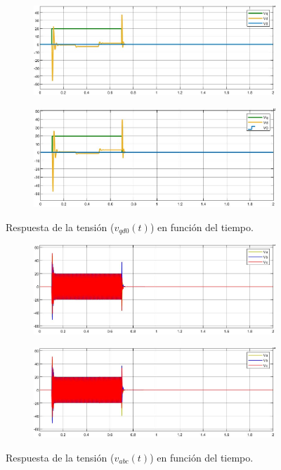 \documentclass{article}
\begin{document}
\begin{figure}[H]
    \centering
    \begin{subfigure}[b]{0.8\textwidth}
        \includegraphics[width=\textwidth]{5.1.6_vqd0.jpg}
    \end{subfigure}
    \begin{subfigure}[b]{0.8\textwidth}
        \includegraphics[width=1\textwidth]{5.1.6_vqd0_NL.jpg}
    \end{subfigure}
    \caption{Respuesta de la tensión ($v_{qd0}(t)$) en función del tiempo.}
    \label{fig:temperatura}
\end{figure}

\begin{figure}[H]
    \centering
    \begin{subfigure}[b]{0.8\textwidth}
        \includegraphics[width=\textwidth]{5.1.6_vabc.jpg}
    \end{subfigure}
    \begin{subfigure}[b]{0.8\textwidth}
        \includegraphics[width=1\textwidth]{5.1.6_vabc_NL.jpg}
    \end{subfigure}
    \caption{Respuesta de la tensión ($v_{abc}(t)$) en función del tiempo.}
    \label{fig:temperatura}
\end{figure}
\end{document}
